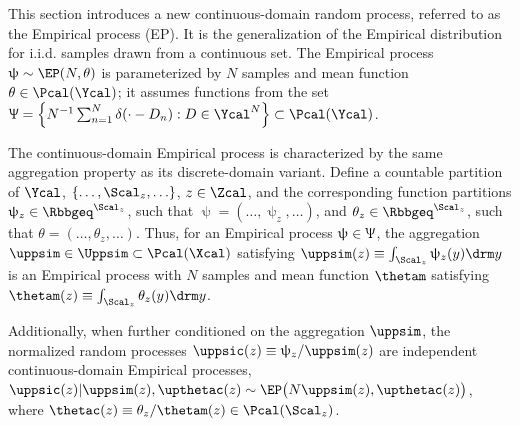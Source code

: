 \documentclass[12pt]{report}
\begin{document}
This section introduces a new continuous-domain random process, referred to as the Empirical process (EP). It is the generalization of the Empirical distribution for i.i.d. samples drawn from a continuous set. The Empirical process $\uppsi \sim \EP(N,\theta)$ is parameterized by $N$ samples and mean function $\theta \in \Pcal(\Ycal)$; it assumes functions from the set $\Uppsi = \left\{ N^{-1} \sum_{n=1}^N \delta(\cdot - D_n) : D \in \Ycal^N \right\} \subset \Pcal(\Ycal)$.

The continuous-domain Empirical process is characterized by the same aggregation property as its discrete-domain variant. Define a countable partition of $\Ycal$, $\left\{ \ldots,\Scal_z,\ldots \right\}$, $z \in \Zcal$, and the corresponding function partitions $\uppsi_z \in \Rbbgeq^{\Scal_z}$, such that $\uppsi = \left( \ldots,\uppsi_z,\ldots \right)$, and $\theta_z \in \Rbbgeq^{\Scal_z}$, such that $\theta = \left( \ldots,\theta_z,\ldots \right)$. Thus, for an Empirical process $\uppsi \in \Uppsi$, the aggregation $\uppsim \in \Uppsim \subset \Pcal(\Xcal)$ satisfying $\uppsim(z) \equiv \int_{\Scal_z} \uppsi_z(y) {\drm}y$ is an Empirical process with $N$ samples and mean function $\thetam$ satisfying $\thetam(z) \equiv \int_{\Scal_z} \theta_z(y) {\drm}y$.

Additionally, when further conditioned on the aggregation $\uppsim$, the normalized random processes $\uppsic(z) \equiv \uppsi_z / \uppsim(z)$ are independent continuous-domain Empirical processes, $\uppsic(z) | \uppsim(z), \upthetac(z) \sim \EP\big(N \uppsim(z), \upthetac(z)\big)$, where $\thetac(z) \equiv \theta_z / \thetam(z) \in \Pcal(\Scal_z)$.
\end{document}
